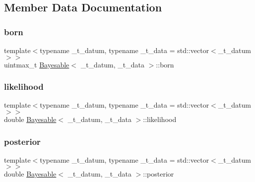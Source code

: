 \subsection{Member Data Documentation}
\mbox{\label{class_bayesable_a39fc0e86fa7395d8fc1ec9c8bf5dc1b5}} 
\subsubsection{\texorpdfstring{born}{born}}
{\footnotesize\ttfamily template$<$typename \+\_\+t\+\_\+datum, typename \+\_\+t\+\_\+data = std\+::vector$<$\+\_\+t\+\_\+datum$>$$>$ \\
uintmax\+\_\+t \hyperlink{class_bayesable}{Bayesable}$<$ \+\_\+t\+\_\+datum, \+\_\+t\+\_\+data $>$\+::born}

\mbox{\label{class_bayesable_ad54a4585cd8861c8002fca6f75aa92c0}} 
\subsubsection{\texorpdfstring{likelihood}{likelihood}}
{\footnotesize\ttfamily template$<$typename \+\_\+t\+\_\+datum, typename \+\_\+t\+\_\+data = std\+::vector$<$\+\_\+t\+\_\+datum$>$$>$ \\
double \hyperlink{class_bayesable}{Bayesable}$<$ \+\_\+t\+\_\+datum, \+\_\+t\+\_\+data $>$\+::likelihood}

\mbox{\label{class_bayesable_ab27fd7227331366093ac8d47e0be1f8a}} 
\subsubsection{\texorpdfstring{posterior}{posterior}}
{\footnotesize\ttfamily template$<$typename \+\_\+t\+\_\+datum, typename \+\_\+t\+\_\+data = std\+::vector$<$\+\_\+t\+\_\+datum$>$$>$ \\
double \hyperlink{class_bayesable}{Bayesable}$<$ \+\_\+t\+\_\+datum, \+\_\+t\+\_\+data $>$\+::posterior}

\mbox{\label{class_bayesable_ae09840f8bbd3fb92993970bc7b28dc79}} 
